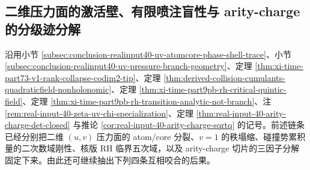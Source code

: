 \subsection{二维压力面的激活壁、有限喷注盲性与 arity-charge 的分级迹分解}\label{subsec:conclusion-realinput40-pressurewall-rh-jet-arity-splitting}
沿用小节 \ref{subsec:conclusion-realinput40-uv-atomcore-phase-shell-trace}、小节 \ref{subsec:conclusion-realinput40-uv-pressure-branch-geometry}、定理 \ref{thm:xi-time-part73-v1-rank-collapse-codim2-tip}、定理 \ref{thm:derived-collision-cumulants-quadraticfield-nonholonomic}、定理 \ref{thm:xi-time-part9pb-rh-critical-quintic-field}、定理 \ref{thm:xi-time-part9pb-rh-transition-analytic-not-branch}、注 \ref{rem:real-input-40-zeta-uv-chi-specialization}、定理 \ref{thm:real-input-40-arity-charge-det-closed} 与推论 \ref{cor:real-input-40-arity-charge-sqrtq} 的记号。前述链条已经分别把二维 \((u,v)\) 压力面的 atom/core 分裂、\(v=1\) 的秩塌缩、碰撞势累积量的二次数域刚性、核版 RH 临界五次域，以及 arity-charge 切片的三因子分解固定下来。由此还可继续抽出下列四条互相咬合的后果。


